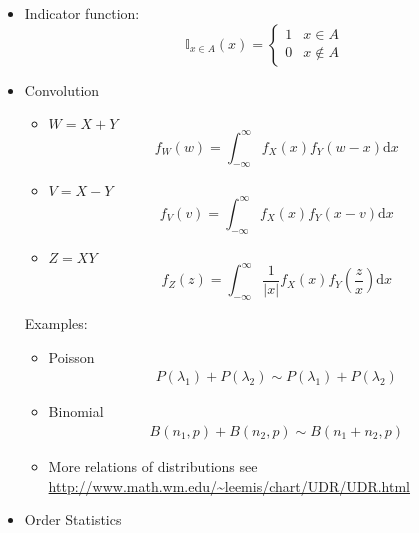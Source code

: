 \begin{itemize}
        
        \item Indicator function:
        \begin{equation}    
            \mathbb{I}_{x\in A}(x)=\begin{cases}
                1& x\in  A\\
                0& x\notin A
            \end{cases}
        \end{equation}
        \item Convolution
        \begin{itemize}
            \item $W=X+Y$
            \begin{equation}        
                f_W(w)=\int_{-\infty}^\infty f_X(x)f_Y(w-x)\mathrm{d}x    
            \end{equation}
            \item $V=X-Y$
            \begin{equation}        
                f_V(v)=\int_{-\infty}^\infty f_X(x)f_Y(x-v)\mathrm{d}x    
            \end{equation}
            \item $Z=XY$
            \begin{equation}        
                f_Z(z)=\int_{-\infty}^\infty \frac{1}{|x|}f_X(x)f_Y(\frac{z}{x})\mathrm{d}x
            \end{equation}
        \end{itemize}

            Examples:        
        \begin{itemize}[topsep=2pt,itemsep=0pt]
            \item Poisson
            \begin{align}
                P(\lambda _1)+P(\lambda _2)\sim P(\lambda _1)+P(\lambda _2) 
            \end{align}
            \item Binomial
            \begin{align}
                B(n_1,p)+B(n_2,p)\sim B(n_1+n_2,p) 
            \end{align}
            \item More relations of distributions see \url{http://www.math.wm.edu/~leemis/chart/UDR/UDR.html}
            
            
        \end{itemize}
        
        \item Order Statistics
        

\end{itemize}
